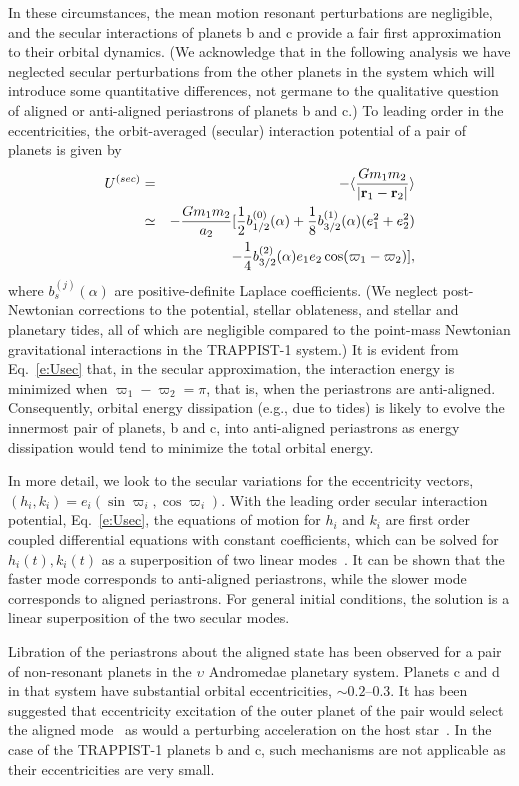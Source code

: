 \documentclass[fleqn,usenatbib]{mnras} %
\begin{document}
In these circumstances, the mean motion resonant perturbations are negligible, and the secular interactions of planets b and c provide a fair first approximation to their orbital dynamics. (We acknowledge that in the following analysis we have neglected secular perturbations from the other planets in the system which will introduce some quantitative differences, not germane to the qualitative question of aligned or anti-aligned periastrons of planets b and c.) To leading order in the eccentricities, the orbit-averaged (secular) interaction potential of a pair of planets is given by
\begin{eqnarray}
U^{(sec)} &=& -\langle\frac{Gm_1m_2}{|{\bf r}_1-{\bf r}_2|} \rangle \nonumber \\
 &\simeq&
-\frac{Gm_1m_2}{a_2}[\frac{1}{2}b_{1/2}^{(0)}(\alpha)+\frac{1}{8}b_{3/2}^{(1)}(\alpha)(e_1^2+e_2^2) \nonumber\\
&& - \frac{1}{4}b_{3/2}^{(2)}(\alpha)e_1e_2\cos(\varpi_1-\varpi_2) ], \label{e:Usec}
\end{eqnarray}
where $b_s^{(j)}(\alpha)$ are positive-definite Laplace coefficients. (We neglect post-Newtonian corrections to the potential, stellar oblateness, and stellar and planetary tides, all of which are negligible compared to the point-mass Newtonian gravitational interactions in the TRAPPIST-1 system.) It is evident from Eq.~\ref{e:Usec} that, in the secular approximation, the interaction energy is minimized when $\varpi_1-\varpi_2=\pi$, that is, when the periastrons are anti-aligned. Consequently, orbital energy dissipation (e.g., due to tides) is likely to evolve the innermost pair of planets, b and c, into anti-aligned periastrons as energy dissipation would tend to minimize the total orbital energy.

In more detail, we look to the secular variations for the eccentricity vectors, $(h_i,k_i)=e_i(\sin\varpi_i,\cos\varpi_i)$. With the leading order secular interaction potential, Eq.~\ref{e:Usec}, the equations of motion for $h_i$ and $k_i$ are first order coupled differential equations with constant coefficients, which can be solved for $h_i(t),k_i(t)$ as a superposition of two linear modes~\citep{Murray1999}. It can be shown that the faster mode corresponds to anti-aligned periastrons, while the slower mode corresponds to aligned periastrons. For general initial conditions, the solution is a linear superposition of the two secular modes. 

Libration of the periastrons about the aligned state has been observed for a pair of non-resonant planets in the $\upsilon$ Andromedae planetary system. Planets c and d in that system have substantial orbital eccentricities, $\sim0.2$--0.3. It has been suggested that eccentricity excitation of the outer planet of the pair would select the aligned mode~\citep[e.g.][]{Chiang2002,Malhotra2002} as would a perturbing acceleration on the host star~\citep{Namouni2005}. In the case of the TRAPPIST-1 planets b and c, such mechanisms are not applicable as their eccentricities are very small. 
\end{document}
